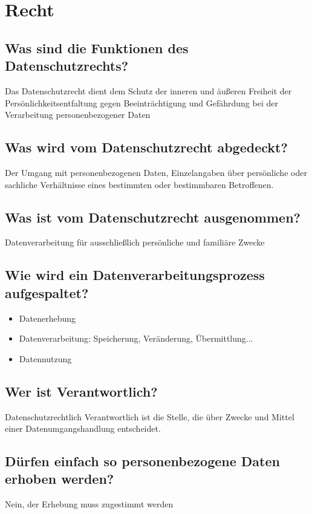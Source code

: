 \section{Recht}
	\subsection{Was sind die Funktionen des Datenschutzrechts?}
	Das Datenschutzrecht dient dem Schutz der inneren und äußeren Freiheit der Persönlichkeitsentfaltung gegen Beeinträchtigung und Gefährdung bei der Verarbeitung personenbezogener Daten
	
	\subsection{Was wird vom Datenschutzrecht abgedeckt?}
	Der Umgang mit personenbezogenen Daten, Einzelangaben über persönliche oder sachliche Verhältnisse eines bestimmten oder bestimmbaren Betroffenen. 
	
	\subsection{Was ist vom Datenschutzrecht ausgenommen?}
	Datenverarbeitung für ausschließlich persönliche und familiäre Zwecke
	
	\subsection{Wie wird ein Datenverarbeitungsprozess aufgespaltet?}
	\begin{itemize}
		\item Datenerhebung
		\item Datenverarbeitung: Speicherung, Veränderung, Übermittlung...
		\item Datennutzung
	\end{itemize}
	
	\subsection{Wer ist Verantwortlich?}
	Datenschutzrechtlich Verantwortlich ist die Stelle, die über Zwecke und Mittel einer Datenumgangshandlung entscheidet.
	
	\subsection{Dürfen einfach so personenbezogene Daten erhoben werden?}
	Nein, der Erhebung muss zugestimmt werden
	
